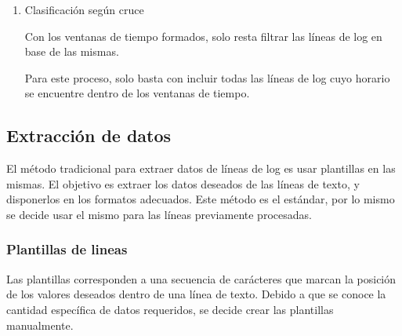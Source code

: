 \begin{enumerate}
    Debido al párrafo anterior, se considera añadir tres margenes paramétricos de tiempo:

    \begin{itemize}
        \item Margen anterior: Cantidad de segundos previo a una ventana de tiempo.

        \item Margen posterior: Cantidad de segundos posterior a una ventana de tiempo.

        \item Umbral intermedio: Cantidad de segundos entre ventanas de tiempo para un mismo instrumento (con margenes incluidos) donde, si la distancia horaria es menor al umbral, se procede a unir dichos bloques.
        
    \end{itemize}

    Debido a lo anterior, se ha determinado que estos márgenes sean paratmetricos, con tal de ajustar de forma apropiada las ventanas de tiempo.

    \item{Clasificación según cruce}

    Con los ventanas de tiempo formados, solo resta filtrar las líneas de log en base de las mismas.

    Para este proceso, solo basta con incluir todas las líneas de log cuyo horario se encuentre dentro de los ventanas de tiempo.

\end{enumerate}

\subsection{Extracción de datos}

El método tradicional para extraer datos de líneas de log es usar plantillas en las mismas. El objetivo es extraer los datos deseados de las líneas de texto, y disponerlos en los formatos adecuados. Este método es el estándar, por lo mismo se decide usar el mismo para las líneas previamente procesadas.

\subsubsection{Plantillas de lineas}

Las plantillas corresponden a una secuencia de carácteres que marcan la posición de los valores deseados dentro de una línea de texto. Debido a que se conoce la cantidad específica de datos requeridos, se decide crear las plantillas manualmente.


